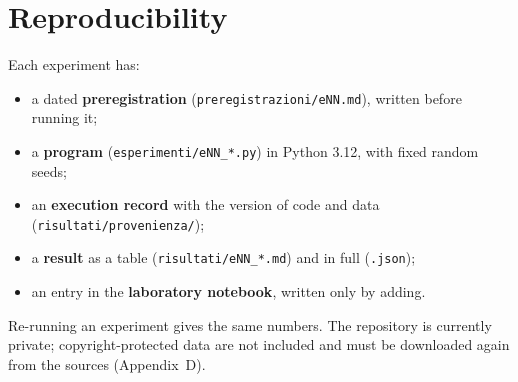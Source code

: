 \section{Reproducibility}

Each experiment has:
\begin{itemize}
\item a dated \textbf{preregistration} (\texttt{preregistrazioni/eNN.md}), written before running it;
\item a \textbf{program} (\texttt{esperimenti/eNN\_*.py}) in Python 3.12, with fixed random seeds;
\item an \textbf{execution record} with the version of code and data (\texttt{risultati/provenienza/});
\item a \textbf{result} as a table (\texttt{risultati/eNN\_*.md}) and in full (\texttt{.json});
\item an entry in the \textbf{laboratory notebook}, written only by adding.
\end{itemize}
Re-running an experiment gives the same numbers. The repository is currently private; copyright-protected data are not
included and must be downloaded again from the sources (Appendix~D).
